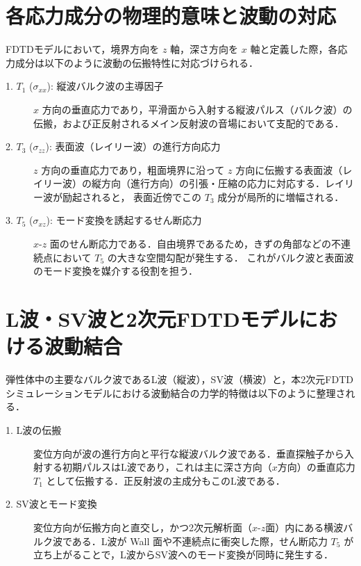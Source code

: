 \documentclass{jarticle}
\begin{document}
\section{各応力成分の物理的意味と波動の対応}
FDTDモデルにおいて，境界方向を $z$ 軸，深さ方向を $x$ 軸と定義した際，各応力成分は以下のように波動の伝搬特性に対応づけられる．
\begin{description}
  \item[1. $T_1$ ($\sigma_{xx}$): 縦波バルク波の主導因子] \par
  $x$ 方向の垂直応力であり，平滑面から入射する縦波パルス（バルク波）の伝搬，および正反射されるメイン反射波の音場において支配的である．
  \item[2. $T_3$ ($\sigma_{zz}$): 表面波（レイリー波）の進行方向応力] \par
  $z$ 方向の垂直応力であり，粗面境界に沿って $z$ 方向に伝搬する表面波（レイリー波）の縦方向（進行方向）の引張・圧縮の応力に対応する．レイリー波が励起されると，
  表面近傍でこの $T_3$ 成分が局所的に増幅される．
  \item[3. $T_5$ ($\sigma_{xz}$): モード変換を誘起するせん断応力] \par
  $x$-$z$ 面のせん断応力である．自由境界であるため，きずの角部などの不連続点において $T_5$ の大きな空間勾配が発生する．
  これがバルク波と表面波のモード変換を媒介する役割を担う．
\end{description}

\section{L波・SV波と2次元FDTDモデルにおける波動結合}
弾性体中の主要なバルク波であるL波（縦波），SV波（横波）と，本2次元FDTDシミュレーションモデルにおける波動結合の力学的特徴は以下のように整理される．
\begin{description}
  \item[1. L波の伝搬] \par
  変位方向が波の進行方向と平行な縦波バルク波である．垂直探触子から入射する初期パルスはL波であり，これは主に深さ方向（$x$方向）の垂直応力 $T_1$ として伝搬する．正反射波の主成分もこのL波である．
  \item[2. SV波とモード変換] \par
  変位方向が伝搬方向と直交し，かつ2次元解析面（$x$-$z$面）内にある横波バルク波である．L波が Wall 面や不連続点に衝突した際，せん断応力 $T_5$ が立ち上がることで，L波からSV波へのモード変換が同時に発生する．
\end{description}
\end{document}
